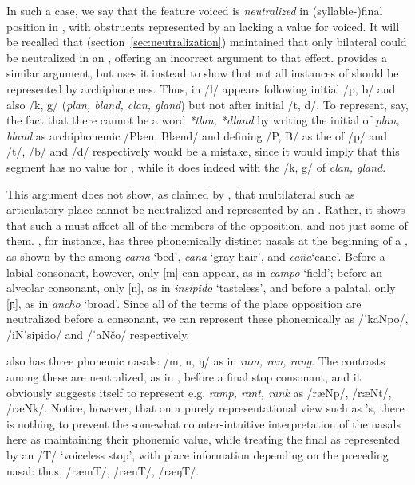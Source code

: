 In such a case, we say that the feature voiced is \emph{neutralized}
in (syllable-)final position in , with obstruents represented by
an  lacking a value for voiced. It will be recalled that
{\Trubetzkoy} (section~\ref{sec:neutralization}) maintained that only
bilateral  could be neutralized in an ,
offering an incorrect argument to that effect. {\Martinet} provides a
similar argument, but uses it instead to show that not all instances of
 should be represented by archiphonemes. Thus,
in  /l/ appears following initial /p, b/ and also /k, g/
(\emph{plan, bland, clan, gland}) but not after initial /t, d/. To
represent, say, the fact that there cannot be a word \emph{*tlan,
  *dland} by writing the initial of \emph{plan, bland} as
archiphonemic /Plæn, Blænd/ and defining /P, B/ as the 
of /p/ and /t/, /b/ and /d/ respectively would be a mistake, since it
would imply that this segment has no value for ,
while it does indeed  with the /k, g/ of \emph{clan, gland}.

This argument does not show, as claimed by {\Trubetzkoy}, that
multilateral  such as articulatory place cannot be
neutralized and represented by an . Rather, it shows that
such a  must affect all of the members of the
opposition, and not just some of them. , for instance, has
three phonemically distinct nasals at the beginning of a , as
shown by the  among \emph{cama} `bed', \emph{cana} `gray
hair', and \emph{caña}`cane'.  Before a labial consonant, however,
only {[m]} can appear, as in \emph{campo} `field'; before an alveolar
consonant, only {[n]}, as in \emph{insipido} `tasteless', and before a
palatal, only {[ɲ]}, as in \emph{ancho} `broad'. Since all of the
terms of the place opposition are neutralized before a consonant, we
can represent these phonemically as /ˈkaNpo/, /iNˈsipido/ and /ˈaNčo/
respectively.

 also has three phonemic nasals: /m, n, ŋ/ as in \emph{ram, ran,
  rang}. The contrasts among these are neutralized, as in ,
before a final stop consonant, and it obviously suggests itself to
represent e.g. \emph{ramp, rant, rank} as /ræNp/, /ræNt/,
/ræNk/. Notice, however, that on a purely representational view such
as {\Martinet}'s, there is nothing to prevent the somewhat
counter-intuitive interpretation of the nasals here as maintaining
their phonemic value, while treating the final  as represented by
an  /T/ `voiceless stop', with place information depending
on the preceding nasal: thus, /ræmT/, /rænT/, /ræŋT/.

